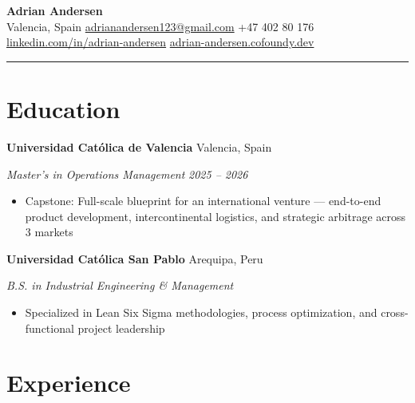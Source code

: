 \documentclass[11pt,letterpaper]{article}
\newcommand{\entry}[4]{%
  \noindent\textbf{#1} \hfill #2 \par\nopagebreak
  \textit{#3} \hfill \textit{#4} \par\nopagebreak
}
\begin{document}
\begin{center}
  {\LARGE\bfseries Adrian Andersen} \\[4pt]
  \enspace Valencia, Spain
  \quad{}\enspace \href{mailto:adrianandersen123@gmail.com}{adrianandersen123@gmail.com}
  \quad{}\enspace +47 402 80 176
  \\[2pt]
  \enspace \href{https://www.linkedin.com/in/adrian-andersen-04933b286/}{linkedin.com/in/adrian-andersen}
  \quad{}\enspace \href{https://adrian-andersen.cofoundy.dev}{adrian-andersen.cofoundy.dev}
\end{center}

\vspace{-0.4em}
\noindent\rule{\textwidth}{0.8pt}
\vspace{-0.8em}

\section{Education}

\entry{Universidad Cat\'{o}lica de Valencia}{Valencia, Spain}{Master's in Operations Management}{2025 -- 2026}
\begin{itemize}
  \item Capstone: Full-scale blueprint for an international venture --- end-to-end product development, intercontinental logistics, and strategic arbitrage across 3 markets
\end{itemize}
\vspace{0.3em}

\entry{Universidad Cat\'{o}lica San Pablo}{Arequipa, Peru}{B.S. in Industrial Engineering \& Management}{}
\begin{itemize}
  \item Specialized in Lean Six Sigma methodologies, process optimization, and cross-functional project leadership
\end{itemize}
\vspace{0.3em}

\section{Experience}
\end{document}
